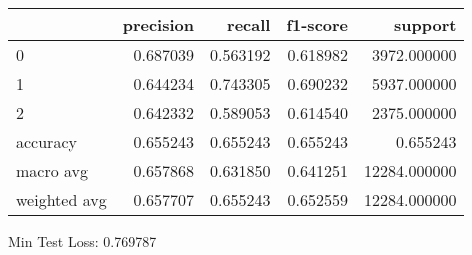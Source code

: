 \begin{tabular}{lrrrr}
\toprule
{} &  precision &    recall &  f1-score &       support \\
\midrule
0            &   0.687039 &  0.563192 &  0.618982 &   3972.000000 \\
1            &   0.644234 &  0.743305 &  0.690232 &   5937.000000 \\
2            &   0.642332 &  0.589053 &  0.614540 &   2375.000000 \\
accuracy     &   0.655243 &  0.655243 &  0.655243 &      0.655243 \\
macro avg    &   0.657868 &  0.631850 &  0.641251 &  12284.000000 \\
weighted avg &   0.657707 &  0.655243 &  0.652559 &  12284.000000 \\
\bottomrule
\end{tabular}

Min Test Loss: 0.769787